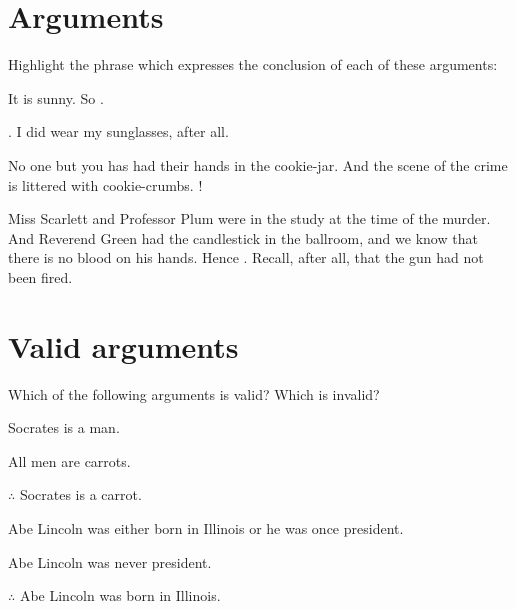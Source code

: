 
\chapter{Arguments}
Highlight the phrase which expresses the conclusion of each of these arguments:
\begin{earg}
	\item It is sunny. So .
	\item {}. I did wear my sunglasses, after all.
	\item No one but you has had their hands in the cookie-jar. And the scene of the crime is littered with cookie-crumbs. !
	\item Miss Scarlett and Professor Plum were in the study at the time of the murder. And Reverend Green had the candlestick in the ballroom, and we know that there is no blood on his hands. Hence . Recall, after all, that the gun had not been fired.
\end{earg}

\chapter{Valid arguments}
\problempart
Which of the following arguments is valid? Which is invalid?

\begin{earg}
\item Socrates is a man.
\item All men are carrots.
\item[$\therefore$]  Socrates is a carrot. \hfill {}
\end{earg}

\begin{earg}
\item Abe Lincoln was either born in Illinois or he was once president.
\item Abe Lincoln was never president.
\item[$\therefore$] Abe Lincoln was born in Illinois. \hfill {}
\end{earg}

